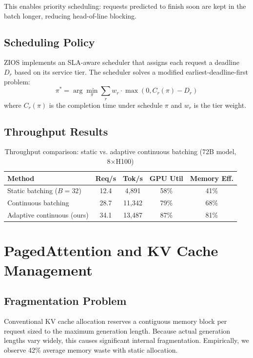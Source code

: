\documentclass[11pt,a4paper]{article}
\begin{document}
This enables priority scheduling: requests predicted to finish soon are kept in the batch longer, reducing head-of-line blocking.

\subsection{Scheduling Policy}

ZIOS implements an SLA-aware scheduler that assigns each request a deadline $D_r$ based on its service tier. The scheduler solves a modified earliest-deadline-first problem:
\begin{equation}
\pi^* = \arg\min_\pi \sum_{r} w_r \cdot \max(0, C_r(\pi) - D_r)
\end{equation}
where $C_r(\pi)$ is the completion time under schedule $\pi$ and $w_r$ is the tier weight.

\subsection{Throughput Results}

\begin{table}[H]
\centering
\caption{Throughput comparison: static vs. adaptive continuous batching (72B model, 8$\times$H100)}
\label{tab:batching_throughput}
\begin{tabular}{lcccc}
\toprule
Method & Req/s & Tok/s & GPU Util & Memory Eff. \\
\midrule
Static batching ($B=32$) & 12.4 & 4,891 & 58\% & 41\% \\
Continuous batching & 28.7 & 11,342 & 79\% & 68\% \\
Adaptive continuous (ours) & 34.1 & 13,487 & 87\% & 81\% \\
\bottomrule
\end{tabular}
\end{table}

\section{PagedAttention and KV Cache Management}

\subsection{Fragmentation Problem}

Conventional KV cache allocation reserves a contiguous memory block per request sized to the maximum generation length. Because actual generation lengths vary widely, this causes significant internal fragmentation. Empirically, we observe 42\% average memory waste with static allocation.
\end{document}
